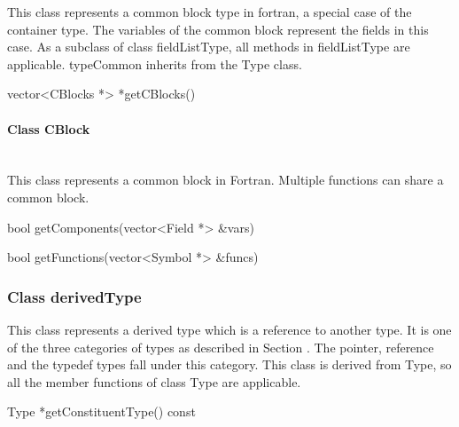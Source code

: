 This class represents a common block type in fortran, a special case of the container type. The variables of the common block represent the fields in this case. As a subclass of class fieldListType, all methods in fieldListType are applicable. typeCommon inherits from the Type class.


\begin{apient}
vector<CBlocks *> *getCBlocks()
\end{apient}

\paragraph{Class CBlock}
\mbox{ }\\

This class represents a common block in Fortran. Multiple functions can share a common block.

\begin{apient}
bool getComponents(vector<Field *> &vars)
\end{apient}

\begin{apient}
bool getFunctions(vector<Symbol *> &funcs)
\end{apient}

\subsubsection{Class derivedType}
This class represents a derived type which is a reference to another type. It is one of the three categories of types as described in Section . The pointer, reference and the typedef types fall under this category. This class is derived from Type, so all the member functions of class Type are applicable.


\begin{apient}
Type *getConstituentType() const
\end{apient}

